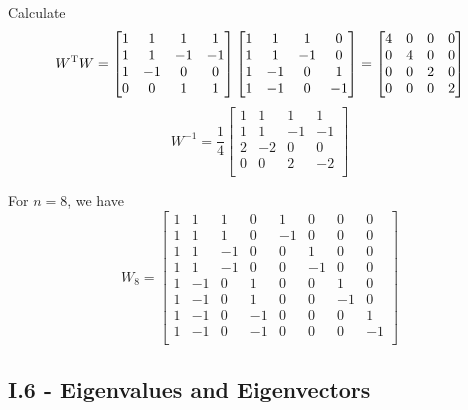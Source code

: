 \documentclass[a4paper]{article}
\begin{document}
Calculate
\[
	W^{\textsc{T}}W = 
	\begin{bmatrix}
		1 & 1 & 1 & 1 \\
		1 & 1 & -1 & -1  \\
		1 & -1 & 0 & 0 \\
		0 & 0 & 1 & 1 \\
	\end{bmatrix}
	\begin{bmatrix}
		1 & 1 & 1 & 0 \\
		1 & 1 & -1 & 0 \\
		1 & -1 & 0 & 1 \\
		1 & -1 & 0 & -1 \\
	\end{bmatrix}
	=
	\begin{bmatrix}
		4 & 0 & 0 & 0 \\
		0 & 4 & 0 & 0 \\
		0 & 0 & 2 & 0 \\
		0 & 0 & 0 & 2 \\
	\end{bmatrix}
\]
\[
	W^{-1} = \frac{1}{4}
	\begin{bmatrix}
		1 & 1 & 1 & 1 \\
		1 & 1 & -1 & -1 \\
		2 & -2 & 0 & 0 \\
		0 & 0 & 2 & -2 \\
	\end{bmatrix}
\]

For \(n = 8\), we have
\[
	W_{8} = 
	\begin{bmatrix}
		1 & 1 & 1 & 0 & 1 & 0 & 0 & 0 \\
		1 & 1 & 1 & 0 & -1 & 0 & 0 & 0 \\
		1 & 1 & -1 & 0 & 0 & 1 & 0 & 0 \\
		1 & 1 & -1 & 0 & 0 & -1 & 0 & 0 \\
		1 & -1 & 0 & 1 & 0 & 0 & 1 & 0 \\
		1 & -1 & 0 & 1 & 0 & 0 & -1 & 0 \\
		1 & -1 & 0 & -1 & 0 & 0 & 0 & 1 \\
		1 & -1 & 0 & -1 & 0 & 0 & 0 & -1 \\
	\end{bmatrix}
\]

\newpage
\subsection{\textsf{I.6 - Eigenvalues and Eigenvectors}}
\end{document}
